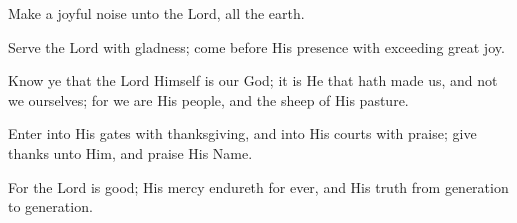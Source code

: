 Make a joyful noise unto the Lord, all the earth.

Serve the Lord with gladness; come before His presence with exceeding great joy.

Know ye that the Lord Himself is our God; it is He that hath made us, and not we ourselves; for we are His people, and the sheep of His pasture.

Enter into His gates with thanksgiving, and into His courts with praise; give thanks unto Him, and praise His Name.

For the Lord is good; His mercy endureth for ever, and His truth from generation to generation.
